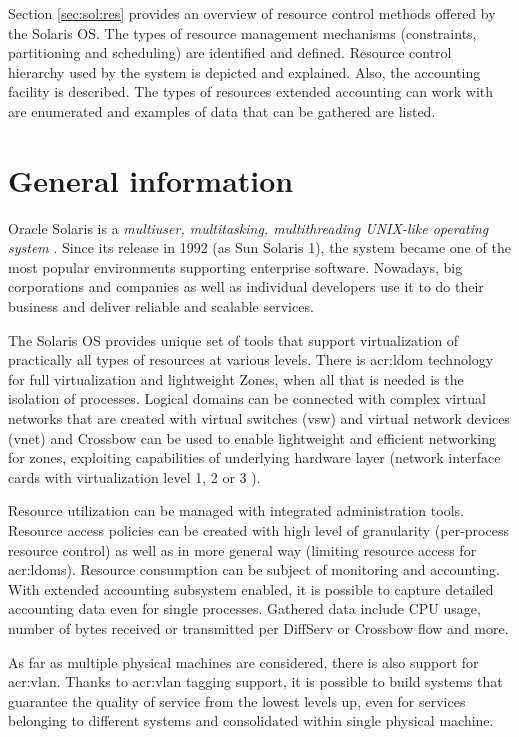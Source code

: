 \documentclass[11pt]{book}
\begin{document}
    Section \ref{sec:sol:res} provides an overview of resource control methods offered by the Solaris OS. The types of
    resource management mechanisms (constraints, partitioning and scheduling) are identified and defined. Resource
    control hierarchy used by the system is depicted and explained. Also, the accounting facility is described. The
    types of resources extended accounting can work with are enumerated and examples of data that can be gathered are
    listed.


    \section{General information}
    \label{sec:sol:general}

      Oracle Solaris is a \textit{multiuser, multitasking, multithreading UNIX-like operating system} \cite{reference}.
      Since its release in 1992 (as Sun Solaris 1), the system became one of the most popular environments supporting
      enterprise software. Nowadays, big corporations and companies as well as individual developers use it to do their
      business and deliver reliable and scalable services.

      The Solaris OS provides unique set of tools that support virtualization of practically all types of resources at
      various levels. There is \gls{acr:ldom} technology for full virtualization and lightweight Zones, when all that is
      needed is the isolation of processes. Logical domains can be connected with complex virtual networks that are
      created with virtual switches (vsw) and virtual network devices (vnet) \cite{ldomag} and Crossbow can be used to
      enable lightweight and efficient networking for zones, exploiting capabilities of underlying hardware layer
      (network interface cards with virtualization level 1, 2 or 3 \cite{santos}).

      Resource utilization can be managed with integrated administration tools. Resource access policies can be created
      with high level of granularity (per-process resource control) as well as in more general way (limiting resource
      access for \gls{acr:ldom}s). Resource consumption can be subject of monitoring and accounting. With extended
      accounting subsystem enabled, it is possible to capture detailed accounting data even for single processes.
      Gathered data include CPU usage, number of bytes received or transmitted per DiffServ or Crossbow flow and more.

      As far as multiple physical machines are considered, there is also support for \gls{acr:vlan}.  Thanks to
      \gls{acr:vlan} tagging support, it is possible to build systems that guarantee the quality of service from the
      lowest levels up, even for services belonging to different systems and consolidated within single physical
      machine.
\end{document}
